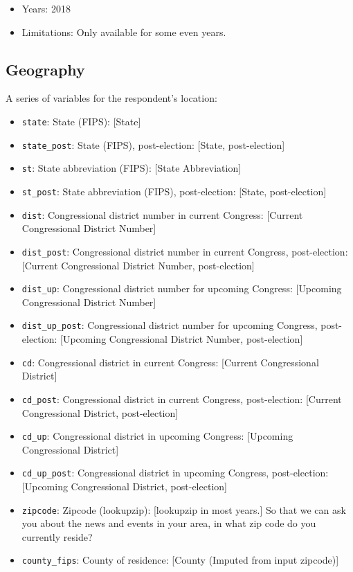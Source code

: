 \documentclass[10pt,article,oneside]{memoir}
\theoremstyle{definition}
\begin{document}
\begin{itemize}
\tightlist
\item
  Years: 2018
\item
  Limitations: Only available for some even years.
\end{itemize}

\hypertarget{geography}{%
\subsection{Geography}\label{geography}}

A series of variables for the respondent's location:

\begin{itemize}
\tightlist
\item
  \texttt{state}: State (FIPS): {[}State{]}
\item
  \texttt{state\_post}: State (FIPS), post-election: {[}State,
  post-election{]}
\item
  \texttt{st}: State abbreviation (FIPS): {[}State Abbreviation{]}
\item
  \texttt{st\_post}: State abbreviation (FIPS), post-election: {[}State,
  post-election{]}
\item
  \texttt{dist}: Congressional district number in current Congress:
  {[}Current Congressional District Number{]}
\item
  \texttt{dist\_post}: Congressional district number in current
  Congress, post-election: {[}Current Congressional District Number,
  post-election{]}
\item
  \texttt{dist\_up}: Congressional district number for upcoming
  Congress: {[}Upcoming Congressional District Number{]}
\item
  \texttt{dist\_up\_post}: Congressional district number for upcoming
  Congress, post-election: {[}Upcoming Congressional District Number,
  post-election{]}
\item
  \texttt{cd}: Congressional district in current Congress: {[}Current
  Congressional District{]}
\item
  \texttt{cd\_post}: Congressional district in current Congress,
  post-election: {[}Current Congressional District, post-election{]}
\item
  \texttt{cd\_up}: Congressional district in upcoming Congress:
  {[}Upcoming Congressional District{]}
\item
  \texttt{cd\_up\_post}: Congressional district in upcoming Congress,
  post-election: {[}Upcoming Congressional District, post-election{]}
\item
  \texttt{zipcode}: Zipcode (lookupzip): {[}lookupzip in most years.{]}
  So that we can ask you about the news and events in your area, in what
  zip code do you currently reside?
\item
  \texttt{county\_fips}: County of residence: {[}County (Imputed from
  input zipcode){]}
\end{itemize}
\end{document}
